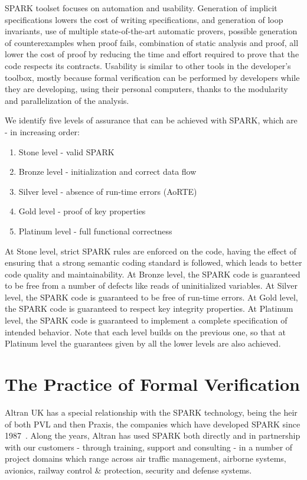 \documentclass{llncs}
\begin{document}
SPARK toolset focuses on automation and usability. Generation of implicit
specifications lowers the cost of writing specifications, and generation of
loop invariants, use of multiple state-of-the-art automatic provers, possible
generation of counterexamples when proof fails, combination of static analysis
and proof, all lower the cost of proof by reducing the time and effort required
to prove that the code respects its contracts. Usability is similar to other
tools in the developer’s toolbox, mostly because formal verification can be
performed by developers while they are developing, using their personal
computers, thanks to the modularity and parallelization of the analysis.

We identify five levels of assurance that can be achieved with SPARK, which are
- in increasing order:

\begin{enumerate}
\item Stone level - valid SPARK
\item Bronze level - initialization and correct data flow
\item Silver level - absence of run-time errors (AoRTE)
\item Gold level - proof of key properties
\item Platinum level - full functional correctness
\end{enumerate}

At Stone level, strict SPARK rules are enforced on the code, having the effect
of ensuring that a strong semantic coding standard is followed, which leads to
better code quality and maintainability. At Bronze level, the SPARK code is
guaranteed to be free from a number of defects like reads of uninitialized
variables. At Silver level, the SPARK code is guaranteed to be free of run-time
errors. At Gold level, the SPARK code is guaranteed to respect key integrity
properties. At Platinum level, the SPARK code is guaranteed to implement a
complete specification of intended behavior. Note that each level builds on the
previous one, so that at Platinum level the guarantees given by all the lower
levels are also achieved.

\section{The Practice of Formal Verification}
\label{sec:practice}

Altran UK has a special relationship with the SPARK technology, being the heir
of both PVL and then Praxis, the companies which have developed SPARK since
1987~\cite{Chapman2014ITP}. Along the years, Altran has used SPARK both directly
and in partnership with our customers - through training, support and
consulting - in a number of project domains which range across air traffic
management, airborne systems, avionics, railway control \& protection, security
and defense systems.
\end{document}
